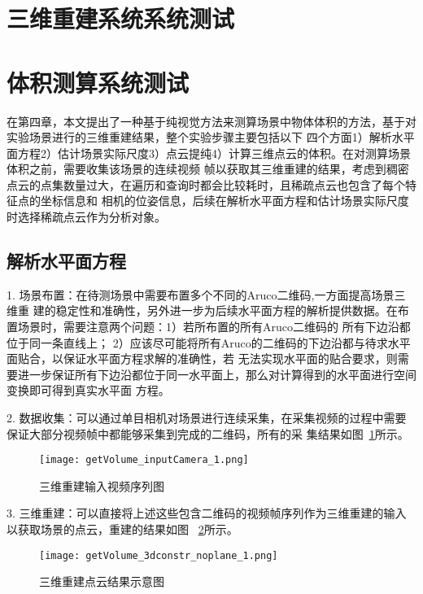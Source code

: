 \section{三维重建系统系统测试}
\label{sec:5.3}
\section{体积测算系统测试}
\label{sec:5.4}
在第四章，本文提出了一种基于纯视觉方法来测算场景中物体体积的方法，基于对实验场景进行的三维重建结果，整个实验步骤主要包括以下
四个方面1）解析水平面方程2）估计场景实际尺度3）点云提纯4）计算三维点云的体积。在对测算场景体积之前，需要收集该场景的连续视频
帧以获取其三维重建的结果，考虑到稠密点云的点集数量过大，在遍历和查询时都会比较耗时，且稀疏点云也包含了每个特征点的坐标信息和
相机的位姿信息，后续在解析水平面方程和估计场景实际尺度时选择稀疏点云作为分析对象。
\subsection{解析水平面方程}
\label{sec:5.4.1}
1.	场景布置：在待测场景中需要布置多个不同的Aruco二维码,一方面提高场景三维重
建的稳定性和准确性，另外进一步为后续水平面方程的解析提供数据。在布置场景时，需要注意两个问题：1）若所布置的所有Aruco二维码的
所有下边沿都位于同一条直线上； 2）应该尽可能将所有Aruco的二维码的下边沿都与待求水平面贴合，以保证水平面方程求解的准确性，若
无法实现水平面的贴合要求，则需要进一步保证所有下边沿都位于同一水平面上，那么对计算得到的水平面进行空间变换即可得到真实水平面
方程。

2.	数据收集：可以通过单目相机对场景进行连续采集，在采集视频的过程中需要保证大部分视频帧中都能够采集到完成的二维码，所有的采
集结果如图~\ref{fig:getVolume_inputCamera}所示。

\begin{figure}[H] %
  \centering
  \texttt{[image: getVolume\_inputCamera\_1.png]}
  \caption{三维重建输入视频序列图}
  \label{fig:getVolume_inputCamera}
  \end{figure}

3.	三维重建：可以直接将上述这些包含二维码的视频帧序列作为三维重建的输入以获取场景的点云，重建的结果如图
~\ref{fig:getVolume_3dconstr_noplane}所示。
\begin{figure}[H] %
  \centering
  \texttt{[image: getVolume\_3dconstr\_noplane\_1.png]}
  \caption{三维重建点云结果示意图}
  \label{fig:getVolume_3dconstr_noplane}
  \end{figure}

